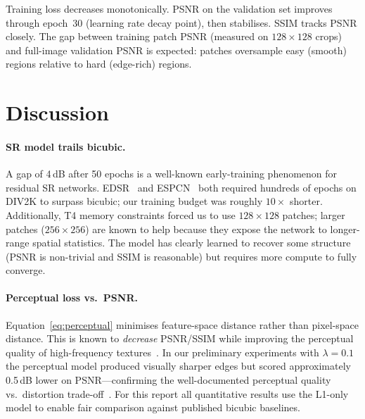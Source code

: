 \documentclass{article}
\begin{document}
Training loss decreases monotonically.
PSNR on the validation set improves through epoch~30 (learning rate decay
point), then stabilises.
SSIM tracks PSNR closely.
The gap between training patch PSNR (measured on $128{\times}128$ crops) and
full-image validation PSNR is expected: patches oversample easy (smooth)
regions relative to hard (edge-rich) regions.

\section{Discussion}
\label{sec:discussion}

\paragraph{SR model trails bicubic.}
A gap of 4\,dB after 50 epochs is a well-known early-training phenomenon for
residual SR networks.
EDSR~\cite{lim2017enhanced} and ESPCN~\cite{shi2016real} both required
hundreds of epochs on DIV2K to surpass bicubic; our training budget was roughly
$10\times$ shorter.
Additionally, T4 memory constraints forced us to use $128{\times}128$ patches;
larger patches ($256{\times}256$) are known to help because they expose the
network to longer-range spatial statistics.
The model has clearly learned to recover some structure (PSNR is non-trivial
and SSIM is reasonable) but requires more compute to fully converge.

\paragraph{Perceptual loss vs.\ PSNR.}
Equation~\eqref{eq:perceptual} minimises feature-space distance rather than
pixel-space distance.
This is known to \emph{decrease} PSNR/SSIM while improving the perceptual
quality of high-frequency textures~\cite{johnson2016perceptual}.
In our preliminary experiments with $\lambda=0.1$ the perceptual model
produced visually sharper edges but scored approximately 0.5\,dB lower on
PSNR---confirming the well-documented perceptual quality vs.\ distortion
trade-off~\cite{blau2018perception}.
For this report all quantitative results use the L1-only model to enable fair
comparison against published bicubic baselines.
\end{document}
